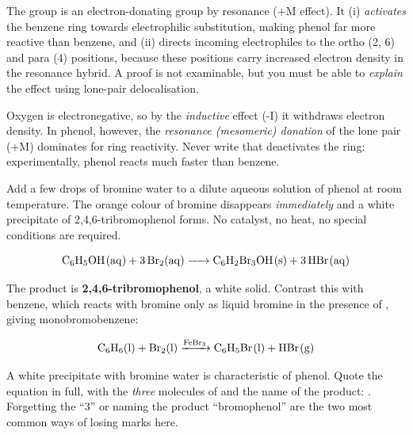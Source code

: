 \documentclass[11pt]{article}
\newcommand{\cle}[1]{{\popxbold\color{popdark}#1}}
\newcounter{popsec}
\newcounter{popsub}
\newcommand{\courssub}[1]{%
  \stepcounter{popsub}%
  \par\vspace{9pt}\noindent{\popxbold\fontsize{11.5}{13}\selectfont\color{popink}{\color{poporange}\thepopsec.\thepopsub}\hspace{6pt}#1}\par\nopagebreak\vspace{4pt}
}
\begin{document}
\begin{propriete}
The  group is an \cle{electron-donating} group by resonance (+M effect). It (i) \emph{activates} the benzene ring towards electrophilic substitution, making phenol far more reactive than benzene, and (ii) directs incoming electrophiles to the \cle{ortho} (2, 6) and \cle{para} (4) positions, because these positions carry increased electron density in the resonance hybrid. A proof is not examinable, but you must be able to \emph{explain} the effect using lone-pair delocalisation.
\end{propriete}

\begin{attention}
Oxygen is electronegative, so by the \emph{inductive} effect (-I) it withdraws electron density. In phenol, however, the \emph{resonance (mesomeric) donation} of the lone pair (+M) dominates for ring reactivity. Never write that  deactivates the ring: experimentally, phenol reacts much faster than benzene.
\end{attention}

\courssub{Halogenation of Phenol}

\begin{experience}
Add a few drops of bromine water to a dilute aqueous solution of phenol at room temperature. The orange colour of bromine disappears \emph{immediately} and a \cle{white precipitate} of 2,4,6-tribromophenol forms. No catalyst, no heat, no special conditions are required.
\end{experience}

\[
\ce{C6H5OH(aq) + 3Br2(aq) -> C6H2Br3OH(s) + 3HBr(aq)}
\]

The product is \textbf{2,4,6-tribromophenol}, a white solid. Contrast this with benzene, which reacts with bromine only as liquid bromine in the presence of , giving monobromobenzene:

\[
\ce{C6H6(l) + Br2(l) ->[FeBr3] C6H5Br(l) + HBr(g)}
\]

\begin{aretenir}
A white precipitate with bromine water is characteristic of phenol. Quote the equation in full, with the \emph{three} molecules of  and the name of the product:
. Forgetting the ``3'' or naming the product ``bromophenol'' are the two most common ways of losing marks here.
\end{aretenir}
\end{document}
